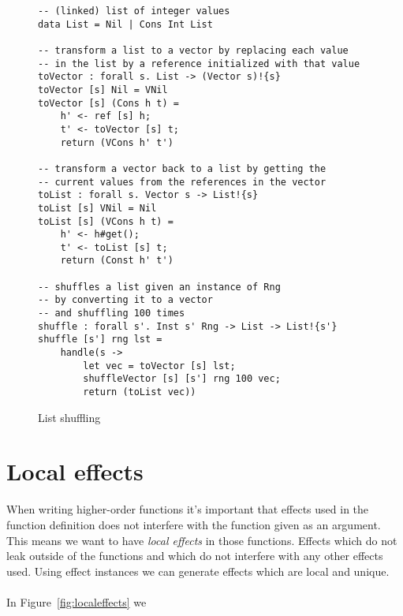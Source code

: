 \begin{figure}[h]
\caption{List shuffling}
\begin{verbatim}
-- (linked) list of integer values
data List = Nil | Cons Int List

-- transform a list to a vector by replacing each value
-- in the list by a reference initialized with that value
toVector : forall s. List -> (Vector s)!{s}
toVector [s] Nil = VNil
toVector [s] (Cons h t) =
	h' <- ref [s] h;
	t' <- toVector [s] t;
	return (VCons h' t')

-- transform a vector back to a list by getting the
-- current values from the references in the vector
toList : forall s. Vector s -> List!{s}
toList [s] VNil = Nil
toList [s] (VCons h t) =
	h' <- h#get();
	t' <- toList [s] t;
	return (Const h' t')

-- shuffles a list given an instance of Rng
-- by converting it to a vector
-- and shuffling 100 times
shuffle : forall s'. Inst s' Rng -> List -> List!{s'}
shuffle [s'] rng lst =
	handle(s ->
		let vec = toVector [s] lst;
		shuffleVector [s] [s'] rng 100 vec;
		return (toList vec))
\end{verbatim}
\label{fig:listshuffle}
\end{figure}

\section{Local effects}
When writing higher-order functions it's important that effects used in the function definition does not interfere with the function given as an argument.
This means we want to have \emph{local effects} in those functions.
Effects which do not leak outside of the functions and which do not interfere with any other effects used.
Using effect instances we can generate effects which are local and unique.
\\\\
In Figure~\ref{fig:localeffects} we 

